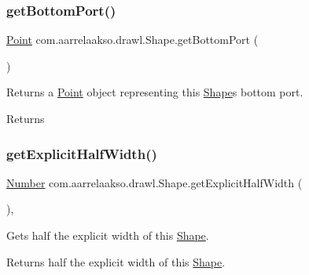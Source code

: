 \subsubsection{\texorpdfstring{get\+Bottom\+Port()}{getBottomPort()}}
{\footnotesize\ttfamily \hyperlink{classcom_1_1aarrelaakso_1_1drawl_1_1_point}{Point} com.\+aarrelaakso.\+drawl.\+Shape.\+get\+Bottom\+Port (\begin{DoxyParamCaption}{ }\end{DoxyParamCaption})\hspace{0.3cm}{\ttfamily [inherited]}}



Returns a \hyperlink{classcom_1_1aarrelaakso_1_1drawl_1_1_point}{Point} object representing this \hyperlink{classcom_1_1aarrelaakso_1_1drawl_1_1_shape}{Shape}\textquotesingle{}s bottom port. 

\begin{DoxyReturn}{Returns}

\end{DoxyReturn}
\mbox{\label{classcom_1_1aarrelaakso_1_1drawl_1_1_shape_a3acdc2fd1944e2efacd0bfbb8aefe89b}} 
\subsubsection{\texorpdfstring{get\+Explicit\+Half\+Width()}{getExplicitHalfWidth()}}
{\footnotesize\ttfamily \hyperlink{interfacecom_1_1aarrelaakso_1_1drawl_1_1_number}{Number} com.\+aarrelaakso.\+drawl.\+Shape.\+get\+Explicit\+Half\+Width (\begin{DoxyParamCaption}{ }\end{DoxyParamCaption})\hspace{0.3cm}{\ttfamily [protected]}, {\ttfamily [inherited]}}



Gets half the explicit width of this \hyperlink{classcom_1_1aarrelaakso_1_1drawl_1_1_shape}{Shape}. 

\begin{DoxyReturn}{Returns}
half the explicit width of this \hyperlink{classcom_1_1aarrelaakso_1_1drawl_1_1_shape}{Shape}. 
\end{DoxyReturn}
\mbox{\label{classcom_1_1aarrelaakso_1_1drawl_1_1_shape_a48917787cedbfd447cd37edbb59a1145}} 
